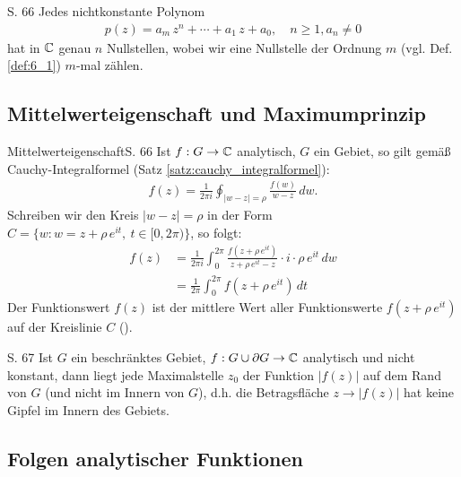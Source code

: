 \begin{satz}{S. 66}
  Jedes nichtkonstante Polynom
  \begin{align}
    p(z) = a_m \, z^n + \cdots + a_1 \, z + a_0, \quad n \geq 1, a_n \neq 0
  \end{align}
  hat in $\mathbb{C}$ genau $n$ Nullstellen, wobei wir eine Nullstelle der Ordnung $m$ (vgl. Def. \ref{def:6_1}) $m$-mal zählen.
\end{satz}



\subsection{Mittelwerteigenschaft und Maximumprinzip}

\begin{bemerkung}{Mittelwerteigenschaft}{S. 66}
  Ist $f: G \to \mathbb{C}$ analytisch, $G$ ein Gebiet, so gilt gemäß Cauchy-Integralformel (Satz \ref{satz:cauchy_integralformel}):
  \begin{align}
    f(z) = \frac{1}{2 \pi i} \oint_{|w-z|=\rho} \frac{f(w)}{w-z} \, dw .
  \end{align}
  Schreiben wir den Kreis $|w-z|=\rho$ in der Form $C = \{ w : w = z + \rho \, e^{it}, \ t \in [0, 2 \pi) \}$, so folgt:
  \begin{align}
    f(z) &= \frac{1}{2 \pi i} \int_0^{2 \pi} \frac{f \left( z + \rho \, e^{it} \right)}{z + \rho \, e^{it}-z} \cdot i \cdot \rho \, e^{it} \, dw \\
    &= \frac{1}{2 \pi} \int_0^{2 \pi} f \left( z + \rho \, e^{it} \right) \, dt
  \end{align}
  Der Funktionswert $f(z)$ ist der mittlere Wert aller Funktionswerte\linebreak
  $f \left( z + \rho \, e^{it} \right)$ auf der Kreislinie $C$ ().
\end{bemerkung}

\begin{satz}[Maximumprinzip]{S. 67}
\label{satz:6_6}
  Ist $G$ ein beschränktes Gebiet, $f: G \cup \partial G \to \mathbb{C}$ analytisch und nicht konstant, dann liegt jede Maximalstelle $z_0$ der Funktion $|f(z)|$ auf dem Rand von $G$ (und nicht im Innern von $G$), d.h. die Betragsfläche $z \to |f(z)|$ hat keine Gipfel im Innern des Gebiets.
\end{satz}



\subsection{Folgen analytischer Funktionen}

